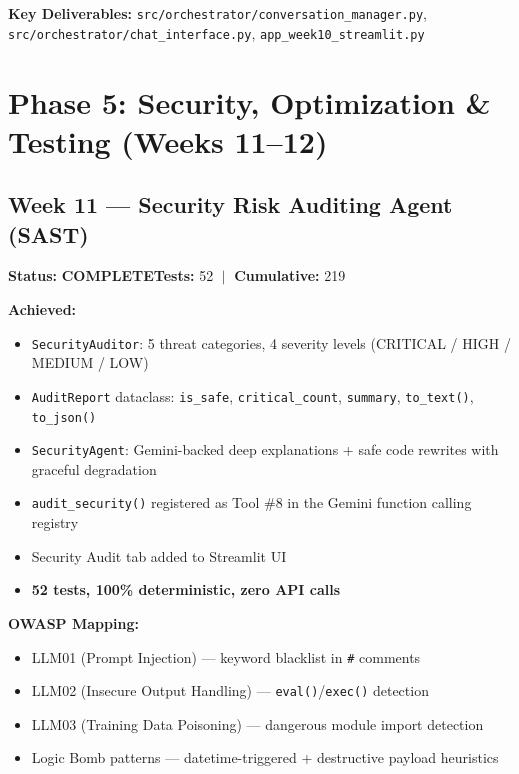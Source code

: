 \documentclass[a4paper,11pt]{article}
\newcommand{\done}{\colorbox{green!25}{\textbf{\small COMPLETE}}}
\begin{document}
\textbf{Key Deliverables:} \texttt{src/orchestrator/conversation\_manager.py}, \texttt{src/orchestrator/chat\_interface.py}, \texttt{app\_week10\_streamlit.py}

\section{Phase 5: Security, Optimization \& Testing (Weeks 11--12)}

\subsection{Week 11 --- Security Risk Auditing Agent (SAST)}

\textbf{Status:} \done \hfill \textbf{Tests:} 52 $\;|\;$ \textbf{Cumulative:} 219

\textbf{Achieved:}
\begin{itemize}[leftmargin=*, itemsep=1pt]
    \item \texttt{SecurityAuditor}: 5 threat categories, 4 severity levels (CRITICAL / HIGH / MEDIUM / LOW)
    \item \texttt{AuditReport} dataclass: \texttt{is\_safe}, \texttt{critical\_count}, \texttt{summary}, \texttt{to\_text()}, \texttt{to\_json()}
    \item \texttt{SecurityAgent}: Gemini-backed deep explanations + safe code rewrites with graceful degradation
    \item \texttt{audit\_security()} registered as Tool \#8 in the Gemini function calling registry
    \item Security Audit tab added to Streamlit UI
    \item \textbf{52 tests, 100\% deterministic, zero API calls}
\end{itemize}

\textbf{OWASP Mapping:}
\begin{itemize}[leftmargin=*, itemsep=1pt]
    \item LLM01 (Prompt Injection) --- keyword blacklist in \texttt{\#} comments
    \item LLM02 (Insecure Output Handling) --- \texttt{eval()}/\texttt{exec()} detection
    \item LLM03 (Training Data Poisoning) --- dangerous module import detection
    \item Logic Bomb patterns --- datetime-triggered + destructive payload heuristics
\end{itemize}
\end{document}
